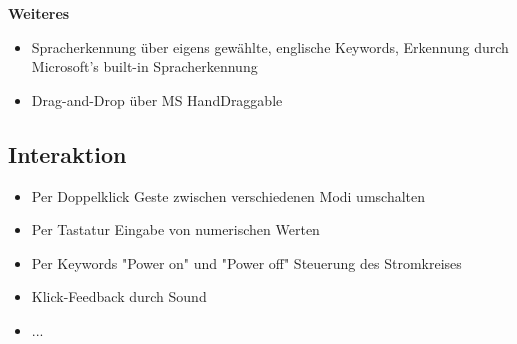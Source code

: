 \textbf{Weiteres}
\begin{itemize}
	\item Spracherkennung über eigens gewählte, englische Keywords, Erkennung durch Microsoft's built-in Spracherkennung
	\item Drag-and-Drop über MS HandDraggable 
\end{itemize}

\subsection{Interaktion}
\begin{itemize}
	\item Per Doppelklick Geste zwischen verschiedenen Modi umschalten
	\item Per Tastatur Eingabe von numerischen Werten
	\item Per Keywords "Power on" und "Power off" Steuerung des Stromkreises
	\item Klick-Feedback durch Sound
	\item ...
\end{itemize}
